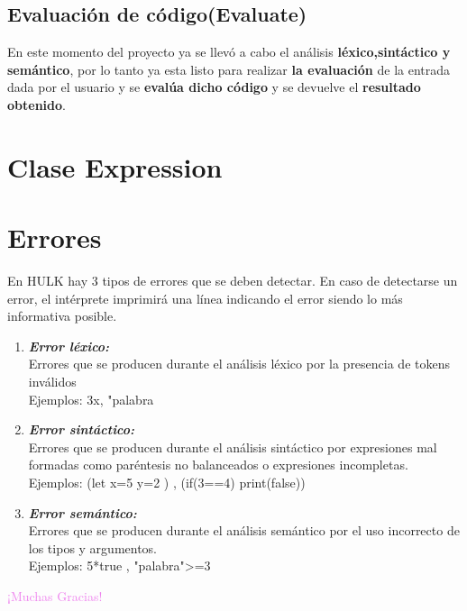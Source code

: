 \documentclass[a4paper,12pt]{article}
\begin{document}
	\subsection{Evaluación de código(Evaluate)}
	
	En este momento del proyecto ya se llevó a cabo el análisis \textbf{léxico,sintáctico y semántico}, por lo tanto ya esta listo para realizar \textbf{la evaluación} de la entrada dada por el usuario y se \textbf{evalúa dicho código} y se devuelve el \textbf{resultado obtenido}.
	
	\section{\color{violet}Clase Expression}
	
	\newpage
	\section{\color{red}Errores}
	
	  \begin{center}
		En HULK hay 3 tipos de errores que se deben detectar. En caso de detectarse un error, el intérprete imprimirá una línea indicando el error siendo lo más informativa posible.
	  \end{center}

    \renewcommand{\labelenumi}{$\bigstar$}
	\begin{enumerate}
		
		\color{red}
		\item \normalcolor \textbf{\textit{Error léxico:}}\\
		Errores que se producen durante el análisis léxico por la presencia de tokens inválidos\\
		Ejemplos: 3x, "palabra
		
		\color{red}
		\item \normalcolor \textbf{\textit{Error sintáctico:}}\\
		Errores que se producen durante el análisis sintáctico por expresiones mal formadas como paréntesis no balanceados o expresiones incompletas.\\
		Ejemplos: (let x=5 y=2 ) , (if(3==4) print(false))
		
		\color{red}
		\item \normalcolor \textbf{\textit{Error semántico:}}\\
		Errores que se producen durante el análisis semántico por el uso incorrecto de los tipos y argumentos.\\
		Ejemplos: 5*true , "palabra">=3
		
	
	\end{enumerate}
	  


	\begin{center}
		\Huge\textcolor{violet}{¡Muchas Gracias!}
	\end{center}
	
\end{document}
